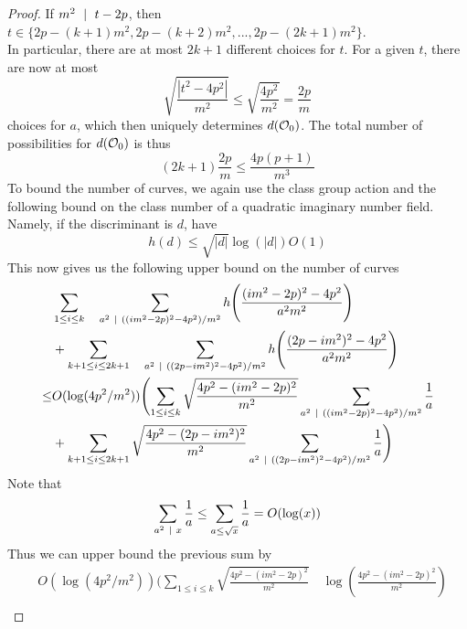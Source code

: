 \begin{proof}
    If $m^2 \ \mid \  t - 2p$, then $t \in \{ 2p - (k + 1)m^2, 2p - (k + 2)m^2, ..., 2p - (2k + 1)m^2 \}$.
    \\
    In particular, there are at most $2k + 1$ different choices for $t$.
    For a given $t$, there are now at most
    \begin{equation*}
        \sqrt{\frac {|t^2 - 4p^2|} {m^2}} \leq \sqrt{\frac {4p^2} {m^2}} = \frac {2p} m
    \end{equation*}
    choices for $a$, which then uniquely determines $d(\mathcal{O}_0)$.
    The total number of possibilities for $d(\mathcal{O}_0)$ is thus
    \begin{equation*}
        (2k + 1) \frac {2p} {m} \leq \frac {4p(p + 1)} {m^3}
    \end{equation*}
    To bound the number of curves, we again use the class group action and the following bound on the class number of a quadratic imaginary number field.
    Namely, if the discriminant is $d$, have
    \begin{equation*}
        h(d) \leq \sqrt{|d|}\log(|d|) O(1)
    \end{equation*}
    This now gives us the following upper bound on the number of curves
    \begin{align*}
        &\sum_{1 \leq i \leq k} \quad \sum_{a^2 \ \mid \  ((im^2 - 2p)^2 - 4p^2)/m^2} h\Biggl( \frac {(im^2 - 2p)^2 - 4p^2} {a^2m^2} \Biggr) \\
        &+ \sum_{k + 1 \leq i \leq 2k + 1} \quad \sum_{a^2 \ \mid \  ((2p - im^2)^2 - 4p^2)/m^2} h\Biggl( \frac {(2p - im^2)^2 - 4p^2} {a^2m^2} \Biggr) \\
        \leq& O(\log(4p^2/m^2)) \Biggl( \sum_{1 \leq i \leq k} \sqrt{\frac {4p^2 - (im^2 - 2p)^2} {m^2}} \sum_{a^2 \ \mid \  ((im^2 - 2p)^2 - 4p^2)/m^2} \frac 1 a \\
        &+ \sum_{k + 1 \leq i \leq 2k + 1} \sqrt{\frac {4p^2 - (2p - im^2)^2} {m^2}} \sum_{a^2 \ \mid \  ((2p - im^2)^2 - 4p^2)/m^2} \frac 1 a \Biggr)
    \end{align*}
    Note that
    \begin{align*}
        \sum_{a^2 \ \mid \  x} \frac 1 a \leq \sum_{a \leq \sqrt{x}} \frac 1 a = O(\log(x))
    \end{align*}
    Thus we can upper bound the previous sum by
    \begin{align*}
        &O(\log(4p^2/m^2)) \Biggl( \sum_{1 \leq i \leq k} \sqrt{ \frac {4p^2 - (im^2 - 2p)^2} {m^2}} \quad \log\left( \frac {4p^2 - (im^2 - 2p)^2} {m^2} \right) \\

\end{align*}
\end{proof}
